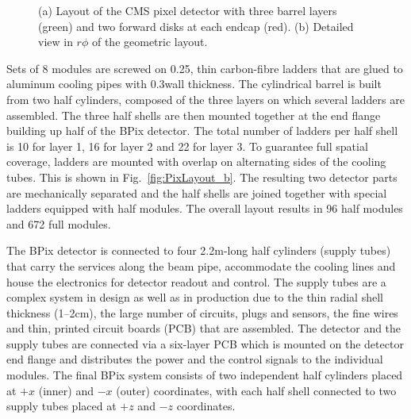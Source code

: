 \begin{figure}[!htb]
 \begin{center}
 \end{center}
 \caption{(a) Layout of the CMS pixel detector with three barrel layers (green) and two forward disks at each endcap (red). (b) Detailed view in $r\phi$ of the geometric layout.}
 \label{fig:PixLayout}
\end{figure}

Sets of 8 modules are screwed on 0.25\mm, thin carbon-fibre ladders that are glued to aluminum cooling pipes with 0.3\mm wall thickness.
The cylindrical barrel is built from two half cylinders, composed of the three layers on which several ladders are assembled. 
The three half shells are then mounted together at the end flange building up half of the BPix detector.
The total number of ladders per half shell is 10 for layer 1, 16 for layer 2 and 22 for layer 3.
To guarantee full spatial coverage, ladders are mounted with overlap on alternating sides of the cooling tubes. This is shown in Fig.~\ref{fig:PixLayout_b}.
The resulting two detector parts are mechanically separated and the half shells are joined together with special ladders equipped with half modules.
The overall layout results in 96 half modules and 672 full modules.

The BPix detector is connected to four 2.2\unit{m}-long half cylinders (supply tubes) that carry the services along the beam pipe, accommodate the cooling lines and house the electronics for detector readout and control. The supply tubes are a complex system in design as well as in production due to the thin radial shell thickness (1--2\unit{cm}), the large number of circuits, plugs and sensors, the fine wires and thin, printed circuit boards (PCB) that are assembled.
The detector and the supply tubes are connected via a six-layer PCB which is mounted on the detector end flange and distributes the power and the control signals to the individual modules.
The final BPix system consists of two independent half cylinders placed at $+x$ (inner) and $-x$ (outer) coordinates,
with each half shell connected to two supply tubes placed at $+z$ and $-z$ coordinates.

